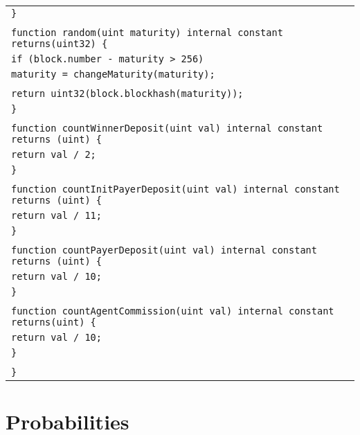 \documentclass[a4paper]{article}
\begin{document}
\begin{tabularx}{\linewidth}{l}
        \qquad\texttt{\}}\\
        \\
        \qquad\texttt{function random(uint maturity) internal constant returns(uint32) \{}\\
        \qquad\qquad\texttt{if (block.number - maturity > 256)}\\
        \qquad\qquad\qquad\texttt{maturity = changeMaturity(maturity);}\\
        \\
        \qquad\qquad\texttt{return uint32(block.blockhash(maturity));}\\
        \qquad\texttt{\}}\\
        \\
        \qquad\texttt{function countWinnerDeposit(uint val) internal constant returns (uint) \{}\\
        \qquad\qquad\texttt{return val / 2;}\\
        \qquad\texttt{\}}\\
        \\
        \qquad\texttt{function countInitPayerDeposit(uint val) internal constant returns (uint) \{}\\
        \qquad\qquad\texttt{return val / 11;}\\
        \qquad\texttt{\}}\\
        \\
        \qquad\texttt{function countPayerDeposit(uint val) internal constant returns (uint) \{}\\
        \qquad\qquad\texttt{return val / 10;}\\
        \qquad\texttt{\}}\\
        \\
        \qquad\texttt{function countAgentCommission(uint val) internal constant returns(uint) \{}\\
        \qquad\qquad\texttt{return val / 10;}\\
        \qquad\texttt{\}}\\
        \\
        \texttt{\}}\\
    \end{tabularx}

\section{Probabilities}
\end{document}
